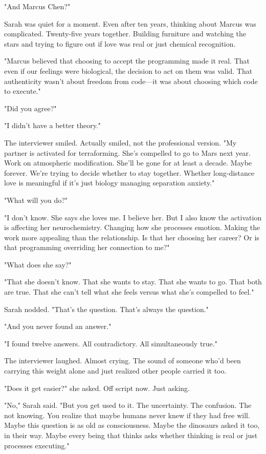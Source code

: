 "And Marcus Chen?"

Sarah was quiet for a moment. Even after ten years, thinking about Marcus was complicated. Twenty-five years together. Building furniture and watching the stars and trying to figure out if love was real or just chemical recognition.

"Marcus believed that choosing to accept the programming made it real. That even if our feelings were biological, the decision to act on them was valid. That authenticity wasn't about freedom from code—it was about choosing which code to execute."

"Did you agree?"

"I didn't have a better theory."

The interviewer smiled. Actually smiled, not the professional version. "My partner is activated for terraforming. She's compelled to go to Mars next year. Work on atmospheric modification. She'll be gone for at least a decade. Maybe forever. We're trying to decide whether to stay together. Whether long-distance love is meaningful if it's just biology managing separation anxiety."

"What will you do?"

"I don't know. She says she loves me. I believe her. But I also know the activation is affecting her neurochemistry. Changing how she processes emotion. Making the work more appealing than the relationship. Is that her choosing her career? Or is that programming overriding her connection to me?"

"What does she say?"

"That she doesn't know. That she wants to stay. That she wants to go. That both are true. That she can't tell what she feels versus what she's compelled to feel."

Sarah nodded. "That's the question. That's always the question."

"And you never found an answer."

"I found twelve answers. All contradictory. All simultaneously true."

The interviewer laughed. Almost crying. The sound of someone who'd been carrying this weight alone and just realized other people carried it too.

"Does it get easier?" she asked. Off script now. Just asking.

"No," Sarah said. "But you get used to it. The uncertainty. The confusion. The not knowing. You realize that maybe humans never knew if they had free will. Maybe this question is as old as consciousness. Maybe the dinosaurs asked it too, in their way. Maybe every being that thinks asks whether thinking is real or just processes executing."

